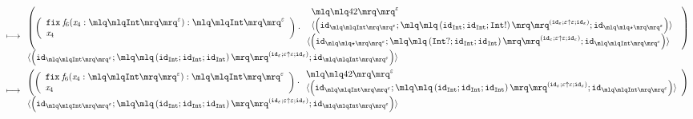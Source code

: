 \documentclass{article}
\begin{document}
\begin{align*}
\longmapsto &\;\begin{array}{l}\left(\left(\begin{array}{l} \mathtt{fix}\; \mathit{f}_{6}(\mathit{x}_{4}:\quot{\mathtt{Int}}^{\varepsilon}): \quot{\mathtt{Int}}^{\varepsilon}\\\mathit{x}_{4}\end{array}\right)\cdot \begin{array}{l}\begin{array}{l}\quot{42}^{\varepsilon}\\\langle\left(\mathtt{id}_{\quot{\mathtt{Int}}^{\varepsilon}};\quot{\left(\mathtt{id}_{\mathtt{Int}};\mathtt{id}_{\mathtt{Int}};\mathtt{Int}!\right)}^{\left(\mathtt{id}_{\varepsilon};\varepsilon \uparrow \varepsilon;\mathtt{id}_{\varepsilon}\right)};\mathtt{id}_{\quot{\star}^{\varepsilon}}\right)\rangle\end{array}\\\langle\left(\mathtt{id}_{\quot{\star}^{\varepsilon}};\quot{\left(\mathtt{Int}?;\mathtt{id}_{\mathtt{Int}};\mathtt{id}_{\mathtt{Int}}\right)}^{\left(\mathtt{id}_{\varepsilon};\varepsilon \uparrow \varepsilon;\mathtt{id}_{\varepsilon}\right)};\mathtt{id}_{\quot{\mathtt{Int}}^{\varepsilon}}\right)\rangle\end{array}\right)\\\langle\left(\mathtt{id}_{\quot{\mathtt{Int}}^{\varepsilon}};\quot{\left(\mathtt{id}_{\mathtt{Int}};\mathtt{id}_{\mathtt{Int}};\mathtt{id}_{\mathtt{Int}}\right)}^{\left(\mathtt{id}_{\varepsilon};\varepsilon \uparrow \varepsilon;\mathtt{id}_{\varepsilon}\right)};\mathtt{id}_{\quot{\mathtt{Int}}^{\varepsilon}}\right)\rangle\end{array}\\ 
\longmapsto &\;\begin{array}{l}\left(\left(\begin{array}{l} \mathtt{fix}\; \mathit{f}_{6}(\mathit{x}_{4}:\quot{\mathtt{Int}}^{\varepsilon}): \quot{\mathtt{Int}}^{\varepsilon}\\\mathit{x}_{4}\end{array}\right)\cdot \begin{array}{l}\quot{42}^{\varepsilon}\\\langle\left(\mathtt{id}_{\quot{\mathtt{Int}}^{\varepsilon}};\quot{\left(\mathtt{id}_{\mathtt{Int}};\mathtt{id}_{\mathtt{Int}};\mathtt{id}_{\mathtt{Int}}\right)}^{\left(\mathtt{id}_{\varepsilon};\varepsilon \uparrow \varepsilon;\mathtt{id}_{\varepsilon}\right)};\mathtt{id}_{\quot{\mathtt{Int}}^{\varepsilon}}\right)\rangle\end{array}\right)\\\langle\left(\mathtt{id}_{\quot{\mathtt{Int}}^{\varepsilon}};\quot{\left(\mathtt{id}_{\mathtt{Int}};\mathtt{id}_{\mathtt{Int}};\mathtt{id}_{\mathtt{Int}}\right)}^{\left(\mathtt{id}_{\varepsilon};\varepsilon \uparrow \varepsilon;\mathtt{id}_{\varepsilon}\right)};\mathtt{id}_{\quot{\mathtt{Int}}^{\varepsilon}}\right)\rangle\end{array}\\ 

\end{align*}
\end{document}
